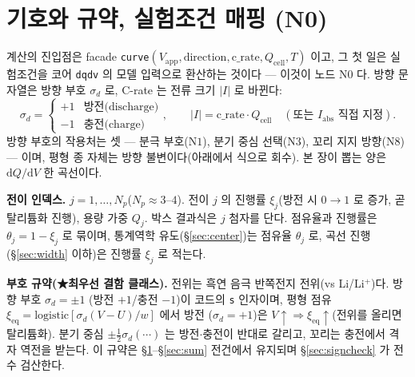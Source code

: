\documentclass[11pt,a4paper]{article}
\newcommand{\dd}{\mathrm{d}}
\newcommand{\eq}{\mathrm{eq}}
\newcommand{\app}{\mathrm{app}}
\newcommand{\cell}{\mathrm{cell}}
\newcommand{\code}[1]{\texttt{#1}}
\begin{document}
\tableofcontents
\newpage

\section{기호와 규약, 실험조건 매핑 (N0)}\label{sec:notation}
계산의 진입점은 facade \code{curve}$(V_\app,\text{direction},\text{c\_rate},Q_\cell,T)$ 이고, 그 첫 일은 실험조건을
코어 \code{dqdv} 의 모델 입력으로 환산하는 것이다 — 이것이 노드 $\mathrm N0$ 다. 방향 문자열은 방향 부호 $\sigma_d$ 로,
C-rate 는 전류 크기 $|I|$ 로 바뀐다:
\begin{equation}
\sigma_d=\begin{cases}+1 & \text{방전(discharge)}\\ -1 & \text{충전(charge)}\end{cases},
\qquad
|I|=\text{c\_rate}\cdot Q_\cell\quad(\text{또는 }I_\mathrm{abs}\text{ 직접 지정}).
\label{eq:n0map}
\end{equation}
방향 부호의 작용처는 셋 — 분극 부호($\mathrm N1$), 분기 중심 선택($\mathrm N3$), 꼬리 지지 방향($\mathrm N8$) — 이며,
평형 종 자체는 방향 불변이다(아래에서 식으로 회수). 본 장이 뽑는 양은 $\dd Q/\dd V$ 한 곡선이다.

\textbf{전이 인덱스.} $j=1,\dots,N_p$($N_p\approx3$--$4$). 전이 $j$ 의 진행률 $\xi_j$(방전 시 $0\to1$ 로 증가, 곧 탈리튬화 진행),
용량 가중 $Q_j$. 박스 결과식은 $j$ 첨자를 단다. 점유율과 진행률은 $\theta_j=1-\xi_j$ 로 묶이며, 통계역학 유도(\S\ref{sec:center})는
점유율 $\theta_j$ 로, 곡선 진행(\S\ref{sec:width} 이하)은 진행률 $\xi_j$ 로 적는다.

\textbf{부호 규약(★최우선 결함 클래스).} 전위는 흑연 음극 반쪽전지 전위(vs Li/Li$^+$)다. 방향 부호 $\sigma_d=\pm1$
(방전 $+1$/충전 $-1$)이 코드의 \code{s} 인자이며, 평형 점유 $\xi_\eq=\mathrm{logistic}[\sigma_d(V-U)/w]$ 에서 방전
($\sigma_d=+1$)은 $V\!\uparrow\Rightarrow\xi_\eq\!\uparrow$(전위를 올리면 탈리튬화). 분기 중심 $\pm\tfrac12\sigma_d(\cdots)$
는 방전$\cdot$충전이 반대로 갈리고, 꼬리는 충전에서 격자 역전을 받는다. 이 규약은 \S\ref{sec:notation}--\S\ref{sec:sum}
전건에서 유지되며 \S\ref{sec:signcheck} 가 전수 검산한다.
\end{document}
